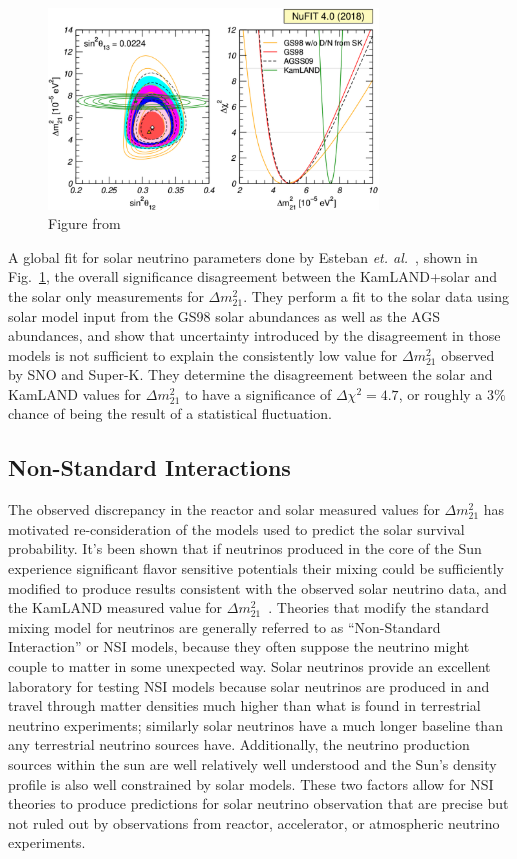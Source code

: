 \begin{figure}[htbp]
    \centering
    \includegraphics[width=0.78\textwidth]{nufit_dm21_tension}
    \caption[]{Figure from~\citep{nu_fit4}}
    \label{fig:nufit_dm21_tension}
\end{figure}
A global fit for solar neutrino parameters done by Esteban \textit{et. al.}~\citep{nu_fit4},
shown in Fig.~\ref{fig:nufit_dm21_tension},
the overall significance disagreement between the KamLAND+solar and the solar only
measurements for $\Delta m^{2}_{21}$.
They perform a fit to the solar data using solar model input from the GS98 solar abundances
as well as the AGS abundances, and show that uncertainty introduced by the
disagreement in those models is not sufficient to explain the consistently
low value for $\Delta m^{2}_{21}$ observed by SNO and Super-K.
They determine the disagreement between the solar and KamLAND values for
$\Delta m^{2}_{21}$ to have a significance of $\Delta \chi^{2} = 4.7$, or
roughly a $3\%$ chance of being the result of a statistical fluctuation.


\subsection{Non-Standard Interactions}
\label{sec:nsi}
The observed discrepancy in the reactor and solar measured values for $\Delta m^{2}_{21}$
has motivated re-consideration of the models used to predict the solar survival
probability.
It's been shown that if neutrinos produced in the core of the Sun experience
significant flavor sensitive potentials their mixing could be sufficiently modified
to produce results consistent with the observed solar neutrino data, and
the KamLAND measured value for $\Delta m^{2}_{21}$~\citep{richie_nsi,mavans_nsi, nsi_friedland}.
Theories that modify the standard mixing model for neutrinos are generally
referred to as ``Non-Standard Interaction'' or NSI models, because
they often suppose the neutrino might couple to matter in some unexpected way.
Solar neutrinos provide an excellent laboratory for testing NSI models
because solar neutrinos are produced in and travel through matter densities much
higher than what is found in terrestrial neutrino experiments;
similarly solar neutrinos have a much longer baseline than any terrestrial
neutrino sources have.
Additionally, the neutrino production sources within the sun are well
relatively well understood and the Sun's density profile is also well
constrained by solar models.
These two factors allow for NSI theories to produce predictions for solar
neutrino observation that are precise but not ruled out by observations from
reactor, accelerator, or atmospheric neutrino experiments.

